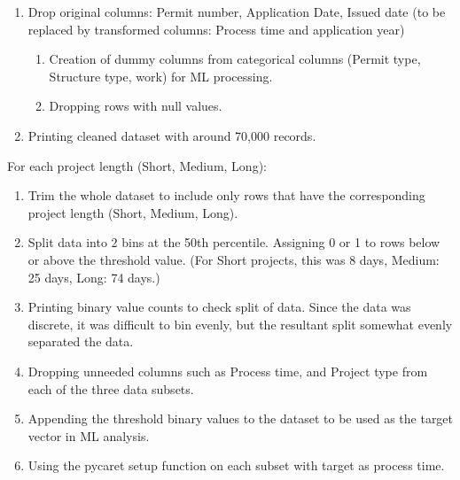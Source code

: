 \documentclass{article}
\begin{document}
\begin{enumerate}
    \item Drop original columns: Permit number, Application Date, Issued date (to be replaced by transformed columns: Process time and application year)
    \begin{enumerate}
        \item Creation of dummy columns from categorical columns (Permit type, Structure type, work) for ML processing.
        \item Dropping rows with null values.
    \end{enumerate}
    \item Printing cleaned dataset with around 70,000 records. 
\end{enumerate}
\newpage
For each project length (Short, Medium, Long):
\begin{enumerate}
    \item Trim the whole dataset to include only rows that have the corresponding project length (Short, Medium, Long). 
    \item Split data into 2 bins at the 50th percentile. Assigning 0 or 1 to rows below or above the threshold value. (For Short projects, this was 8 days, Medium: 25 days, Long: 74 days.)
    \item Printing binary value counts to check split of data. Since the data was discrete, it was difficult to bin evenly, but the resultant split somewhat evenly separated the data. 
    \item Dropping unneeded columns such as Process time, and Project type from each of the three data subsets.
    \item Appending the threshold binary values to the dataset to be used as the target vector in ML analysis.
    \item Using the pycaret setup function on each subset with target as process time. 
\end{enumerate}
\end{document}
